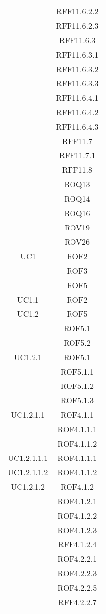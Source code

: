 \begin{longtable}{|c|c|}
& RFF11.6.2.2\\
& RFF11.6.2.3\\
& RFF11.6.3\\
& RFF11.6.3.1\\
& RFF11.6.3.2\\
& RFF11.6.3.3\\
& RFF11.6.4.1\\
& RFF11.6.4.2\\
& RFF11.6.4.3\\
& RFF11.7\\
& RFF11.7.1\\
& RFF11.8\\
& ROQ13\\
& ROQ14\\
& ROQ16\\
& ROV19\\
& ROV26\\


\midrule
UC1
& ROF2\\
& ROF3\\
& ROF5\\

\midrule
UC1.1
& ROF2\\

\midrule
UC1.2
& ROF5\\
& ROF5.1\\
& ROF5.2\\

\midrule
UC1.2.1
& ROF5.1\\
& ROF5.1.1\\
& ROF5.1.2\\
& ROF5.1.3\\

\midrule
UC1.2.1.1
& ROF4.1.1\\
& ROF4.1.1.1\\
& ROF4.1.1.2\\

\midrule
UC1.2.1.1.1
& ROF4.1.1.1\\

\midrule
UC1.2.1.1.2
& ROF4.1.1.2\\

\midrule
UC1.2.1.2
& ROF4.1.2\\
& ROF4.1.2.1\\
& ROF4.1.2.2\\
& ROF4.1.2.3\\
& RFF4.1.2.4\\
& ROF4.2.2.1\\
& ROF4.2.2.3\\
& ROF4.2.2.5\\
& RFF4.2.2.7\\


\end{longtable}
